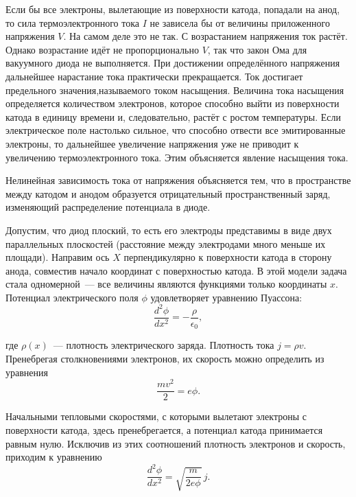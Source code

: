 Если бы все электроны, вылетающие из поверхности катода, попадали на анод, то сила термоэлектронного тока $I$ не
зависела бы от величины приложенного напряжения $V$. На самом деле это не так. С возрастанием напряжения ток растёт.
Однако возрастание идёт не пропорционально $V$, так что закон Ома для вакуумного диода не выполняется. При достижении определённого напряжения дальнейшее нарастание тока практически прекращается. Ток достигает предельного значения,называемого током насыщения. Величина тока насыщения определяется количеством электронов, которое способно выйти из поверхности катода в единицу времени и, следовательно, растёт с ростом температуры. Если электрическое поле настолько сильное, что способно отвести все эмитированные электроны, то дальнейшее увеличение напряжения уже не приводит к увеличению термоэлектронного тока. Этим объясняется явление насыщения тока.

Нелинейная зависимость тока от напряжения объясняется тем, что в пространстве между катодом и анодом образуется
отрицательный пространственный заряд, изменяющий распределение потенциала в диоде.

Допустим, что диод плоский, то есть его электроды представимы в виде двух параллельных плоскостей (расстояние между
электродами много меньше их площади). Направим ось $X$ перпендикулярно к поверхности катода в сторону анода, совместив начало координат с поверхностью катода. В этой модели задача стала одномерной~--- все величины являются функциями только координаты $x$. Потенциал электрического поля $\phi$ удовлетворяет уравнению Пуассона:
\begin{equation}
\frac{d^2\phi}{dx^2}=-\frac{\rho}{\epsilon_0},
\label{3FlatGaussTheorem}
\end{equation}

где $\rho(x)$~--- плотность электрического заряда. Плотность тока $j=\rho v$. Пренебрегая столкновениями электронов, их скорость можно определить из уравнения
$$
\frac{mv^2}{2}=e\phi.
$$

Начальными тепловыми скоростями, с которыми вылетают электроны с поверхности катода, здесь пренебрегается, а потенциал катода принимается равным нулю. Исключив из этих соотношений плотность электронов и скорость, приходим к уравнению
\begin{equation}
\frac{d^2\phi}{dx^2}=\sqrt{\frac{m}{2e\phi}}\, j.
\label{3FlatDiodeDiffur}
\end{equation}

